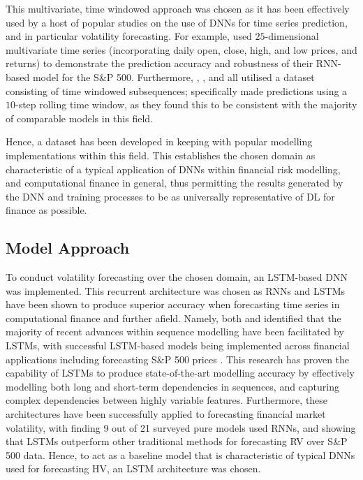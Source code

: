 \documentclass[a4paper, 11pt]{report}
\begin{document}
    This multivariate, time windowed approach was chosen as it has been effectively used by a host of popular studies on the use of DNNs for time series prediction, and in particular volatility forecasting. For example, \citet{xiong-2016} used $25$-dimensional multivariate time series (incorporating daily open, close, high, and low prices, and returns) to demonstrate the prediction accuracy and robustness of their RNN-based model for the S\&P 500. Furthermore, \citet{xiong-2016}, \citet{bucci-2020}, and \citet{rodikov-2022} all utilised a dataset consisting of time windowed subsequences; \citet{xiong-2016} specifically made predictions using a $10$-step rolling time window, as they found this to be consistent with the majority of comparable models in this field.

    Hence, a dataset has been developed in keeping with popular modelling implementations within this field. This establishes the chosen domain as characteristic of a typical application of DNNs within financial risk modelling, and computational finance in general, thus permitting the results generated by the DNN and training processes to be as universally representative of DL for finance as possible.


    \subsection{Model Approach}

    To conduct volatility forecasting over the chosen domain, an LSTM-based DNN was implemented. This recurrent architecture was chosen as RNNs and LSTMs have been shown to produce superior accuracy when forecasting time series in computational finance and further afield. Namely, both \citet{lipton-2015} and \citet{yu-2019} identified that the majority of recent advances within sequence modelling have been facilitated by LSTMs, with successful LSTM-based models being implemented across financial applications including forecasting S\&P 500 prices \citep{fjellstrom-2022}. This research has proven the capability of LSTMs to produce state-of-the-art modelling accuracy by effectively modelling both long and short-term dependencies in sequences, and capturing complex dependencies between highly variable features. Furthermore, these architectures have been successfully applied to forecasting financial market volatility, with \citet{ge-2022} finding 9 out of 21 surveyed pure models used RNNs, and \citet{bucci-2020} showing that LSTMs outperform other traditional methods for forecasting RV over S\&P 500 data. Hence, to act as a baseline model that is characteristic of typical DNNs used for forecasting HV, an LSTM architecture was chosen.
\end{document}
